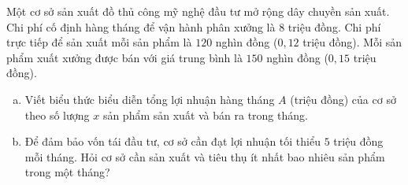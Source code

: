 \begin{bt}%
Một cơ sở sản xuất đồ thủ công mỹ nghệ đầu tư mở rộng dây chuyền sản xuất. Chi phí cố định hàng tháng để vận hành phân xưởng là $8$ triệu đồng. Chi phí trực tiếp để sản xuất mỗi sản phẩm là $120$ nghìn đồng ($0{,}12$ triệu đồng). Mỗi sản phẩm xuất xưởng được bán với giá trung bình là $150$ nghìn đồng ($0{,}15$ triệu đồng).
\begin{enumerate}[a)]
    \item Viết biểu thức biểu diễn tổng lợi nhuận hàng tháng $A$ (triệu đồng) của cơ sở theo số lượng $x$ sản phẩm sản xuất và bán ra trong tháng.
    \item Để đảm bảo vốn tái đầu tư, cơ sở cần đạt lợi nhuận tối thiểu $5$ triệu đồng mỗi tháng. Hỏi cơ sở cần sản xuất và tiêu thụ ít nhất bao nhiêu sản phẩm trong một tháng?
\end{enumerate}
\end{bt}

